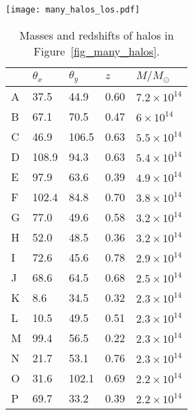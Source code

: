\begin{figure*}%
 \centering
 \texttt{[image: many\_halos\_los.pdf]} 
 \caption[Reconstruction of an artificial shear field with the SVD filter]{
   Reconstruction of an artificial shear field with the 
   SVD filter \textit{(top panels)}, 
   Transverse Wiener filter \textit{(middle panels)}, 
   and Radial Wiener filter \textit{(bottom panels)}.  
   The left column shows the projected density reconstruction
   across the field using each method, all
   smoothed with a 1-pixel wide Gaussian filter.  
   Red circles indicate the true locations of the input halos.
   The right column shows the line-of-sight distributions of the
   twelve most massive NFW halos, labeled A-L.  The masses and redshifts of
   the halos are listed in Table~\ref{halo_table}.
   The signal suppression of the transverse Wiener filter seen in 
   Figure~\ref{fig_los_plot_ST} is apparent in the color-bar scaling
   of the middle panels. The anomalous results seen in halo K are due to
   its proximity to the deweighted border.  As suggested by the discussion
   in Section~\ref{SN_modes}, none of the three methods succeed 
   in recovering precise redshifts of the halos.
  \label{fig_many_halos} }
\end{figure*} 

\begin{table}
\centering
\caption{Masses and redshifts of halos in Figure~\ref{fig_many_halos}.}
\label{halo_table}
\begin{tabular}{lllll}
\hline
& $\theta_x$ & $\theta_y$ & $z$ & $M/M_\odot$ \\
\hline
  A & 37.5 & 44.9 & 0.60 & $7.2\times 10^{14}$ \\
  B & 67.1 & 70.5 & 0.47 & $6\times 10^{14}$ \\
  C & 46.9 & 106.5 & 0.63 & $5.5\times 10^{14}$ \\
  D & 108.9 & 94.3 & 0.63 & $5.4\times 10^{14}$ \\
  E & 97.9 & 63.6 & 0.39 & $4.9\times 10^{14}$ \\
  F & 102.4 & 84.8 & 0.70 & $3.8\times 10^{14}$ \\
  G & 77.0 & 49.6 & 0.58 & $3.2\times 10^{14}$ \\
  H & 52.0 & 48.5 & 0.36 & $3.2\times 10^{14}$ \\
  I & 72.6 & 45.6 & 0.78 & $2.9\times 10^{14}$ \\
  J & 68.6 & 64.5 & 0.68 & $2.5\times 10^{14}$ \\
  K & 8.6 & 34.5 & 0.32 & $2.3\times 10^{14}$ \\
  L & 10.5 & 49.5 & 0.51 & $2.3\times 10^{14}$ \\
  M & 99.4 & 56.5 & 0.22 & $2.3\times 10^{14}$ \\
  N & 21.7 & 53.1 & 0.76 & $2.3\times 10^{14}$ \\
  O & 31.6 & 102.1 & 0.69 & $2.2\times 10^{14}$ \\
  P & 69.7 & 33.2 & 0.39 & $2.2\times 10^{14}$ \\
\hline
\end{tabular}
\end{table} 


